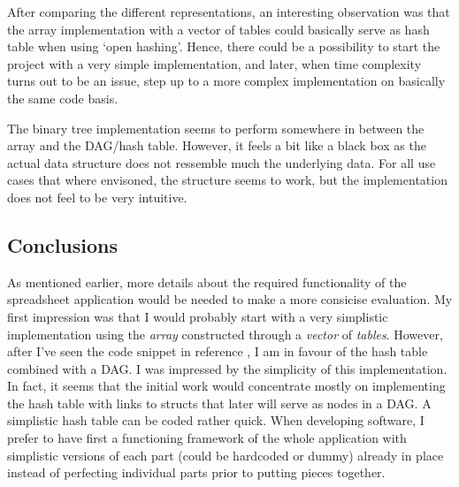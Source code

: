 \documentclass[a4paper,11pt,twoside]{article}
\begin{document}
After comparing the different representations, an interesting
observation was that the array implementation with a vector of tables
could basically serve as hash table when using `open hashing'. Hence,
there could be a possibility to start the project with a very simple
implementation, and later, when time complexity turns out to be an
issue, step up to a more complex implementation on basically the same
code basis. 

The binary tree implementation seems to perform somewhere in between
the array and the DAG/hash table. However, it feels a bit like a black
box as the actual data structure does not ressemble much the
underlying data. For all use cases that where envisoned, the structure
seems to work, but the implementation does not feel to be very
intuitive. 

\subsection{Conclusions}

As mentioned earlier, more details about the required functionality of
the spreadsheet application would be needed to make a more consicise
evaluation. My first impression was that I would probably start with a
very simplistic implementation using the \textit{array} constructed
through a \textit{vector} of \textit{tables}. However, after I've seen
the code snippet in reference \cite{spreadsheet2}, I am in favour of
the hash table combined with a DAG. I was impressed by the simplicity
of this implementation. In fact, it seems that the initial
work would concentrate mostly on implementing the hash table with
links to structs that later will serve as nodes in a DAG. A
simplistic hash table can be coded rather quick. When developing
software, I prefer to have first a functioning framework of the whole
application with simplistic versions of each part (could be hardcoded
or dummy) already in place instead of perfecting individual parts
prior to putting pieces together. 
\end{document}
